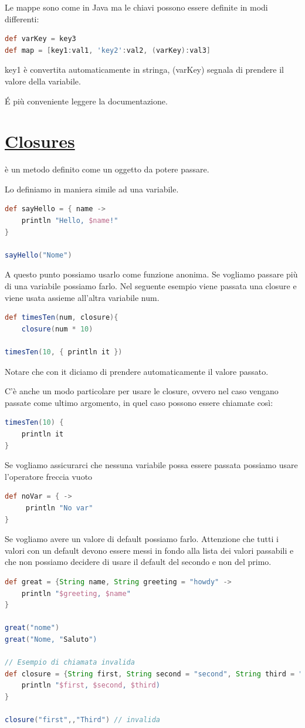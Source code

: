 \documentclass[11pt,a4paper]{book}
\begin{document}
Le mappe sono come in Java ma le chiavi possono essere definite in modi differenti:
\begin{lstlisting}[language = groovy]
def varKey = key3
def map = [key1:val1, 'key2':val2, (varKey):val3]
\end{lstlisting}
key1 è convertita automaticamente in stringa, (varKey) segnala di prendere il valore della variabile.

É più conveniente leggere la documentazione.

\chapter{\href{https://groovy-lang.org/closures.html}{Closures}}
è un metodo definito come un oggetto da potere passare.

Lo definiamo in maniera simile ad una variabile.
\begin{lstlisting}[language = groovy]
def sayHello = { name ->
	println "Hello, $name!"
}

sayHello("Nome")
\end{lstlisting}

A questo punto possiamo usarlo come funzione anonima. Se vogliamo passare più di una variabile possiamo farlo. Nel seguente esempio viene passata una closure e viene usata assieme all'altra variabile num.
\begin{lstlisting}[language = groovy]
def timesTen(num, closure){
	closure(num * 10)
	
timesTen(10, { println it })
\end{lstlisting}

Notare che con it diciamo di prendere automaticamente il valore passato.

C'è anche un modo particolare per usare le closure, ovvero nel caso vengano passate come ultimo argomento, in quel caso possono essere chiamate così:
\begin{lstlisting}[language = groovy]
timesTen(10) {
	println it
}
\end{lstlisting}

Se vogliamo assicurarci che nessuna variabile possa essere passata possiamo usare l'operatore freccia vuoto
\begin{lstlisting}[language = groovy]
def noVar = { ->
     println "No var"
}
\end{lstlisting}

Se vogliamo avere un valore di default possiamo farlo. Attenzione che tutti i valori con un default devono essere messi in fondo alla lista dei valori passabili e che non possiamo decidere di usare il default del secondo e non del primo. 
\begin{lstlisting}[language = groovy]
def great = {String name, String greeting = "howdy" ->
	println "$greeting, $name"
}

great("nome")
great("Nome, "Saluto")

// Esempio di chiamata invalida
def closure = {String first, String second = "second", String third = "third" ->
	println "$first, $second, $third)
}

closure("first",,"Third") // invalida
\end{lstlisting}
\end{document}
